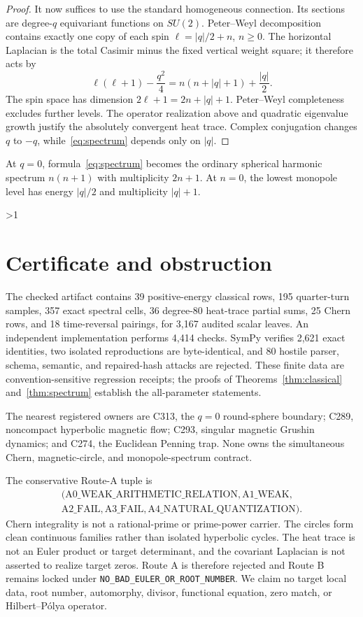 \documentclass[10pt]{article}
\providecommand{\CRevisionRound}{2}
\begin{document}
\begin{proof}
It now suffices to use the standard homogeneous connection.  Its sections
are degree-$q$ equivariant functions on $SU(2)$.  Peter--Weyl
decomposition contains exactly one copy of each spin
$\ell=|q|/2+n$, $n\geq0$.  The horizontal Laplacian is the total Casimir
minus the fixed vertical weight square; it therefore acts by
\[
 \ell(\ell+1)-\frac{q^2}{4}
 =n(n+|q|+1)+\frac{|q|}{2}.
\]
The spin space has dimension $2\ell+1=2n+|q|+1$.  Peter--Weyl completeness
excludes further levels.  The operator realization above and quadratic
eigenvalue growth justify the absolutely convergent heat trace.  Complex
conjugation changes $q$ to $-q$, while~\eqref{eq:spectrum} depends only on
$|q|$.
\end{proof}

At $q=0$, formula~\eqref{eq:spectrum} becomes the ordinary spherical
harmonic spectrum $n(n+1)$ with multiplicity $2n+1$.  At $n=0$, the lowest
monopole level has energy $|q|/2$ and multiplicity $|q|+1$.
\fi

\ifnum\CRevisionRound>1
\section{Certificate and obstruction}
The checked artifact contains 39 positive-energy classical rows, 195
quarter-turn samples, 357 exact spectral cells, 36 degree-80 heat-trace
partial sums, 25 Chern rows, and 18 time-reversal pairings, for 3,167
audited scalar leaves.  An independent implementation performs 4,414
checks.  SymPy verifies 2,621 exact identities, two isolated reproductions
are byte-identical, and 80
hostile parser, schema, semantic, and repaired-hash attacks are rejected.
These finite data are convention-sensitive regression receipts; the proofs
of Theorems~\ref{thm:classical} and~\ref{thm:spectrum} establish the
all-parameter statements.

The nearest registered owners are C313, the $q=0$ round-sphere boundary;
C289, noncompact hyperbolic magnetic flow; C293, singular magnetic Grushin
dynamics; and C274, the Euclidean Penning trap.  None owns the simultaneous
Chern, magnetic-circle, and monopole-spectrum contract.

The conservative Route-A tuple is
\begin{gather*}
 (\mathrm{A0\_WEAK\_ARITHMETIC\_RELATION},\mathrm{A1\_WEAK},\\
 \mathrm{A2\_FAIL},\mathrm{A3\_FAIL},
 \mathrm{A4\_NATURAL\_QUANTIZATION}).
\end{gather*}
Chern integrality is not a rational-prime or prime-power carrier.  The
circles form clean continuous families rather than isolated hyperbolic
cycles.  The heat trace is not an Euler product or target determinant, and
the covariant Laplacian is not asserted to realize target zeros.  Route A is
therefore rejected and Route B remains locked under
\texttt{NO\_BAD\_EULER\_OR\_ROOT\_NUMBER}.  We claim no target local data,
root number, automorphy, divisor, functional equation, zero match, or
Hilbert--P\'olya operator.
\end{document}

